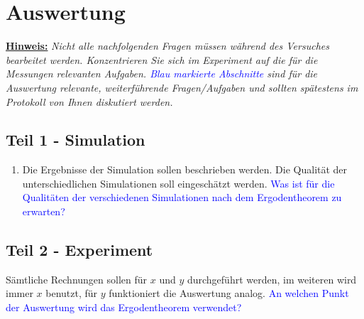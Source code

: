 \section*{Auswertung}

\textbf{\underline{Hinweis:}}\textit{ Nicht alle nachfolgenden Fragen müssen während des Versuches bearbeitet werden. Konzentrieren Sie sich im Experiment auf die für die Messungen relevanten Aufgaben. \textcolor{blue}{Blau markierte Abschnitte} sind für die Auswertung relevante, weiterführende Fragen/Aufgaben und sollten spätestens im Protokoll von Ihnen diskutiert werden.}\newline

\subsection*{Teil 1 - Simulation}

\begin{enumerate}

  \item Die Ergebnisse der Simulation sollen beschrieben werden. Die Qualität der unterschiedlichen Simulationen soll eingeschätzt werden.
  \textcolor{blue}{Was ist für die Qualitäten der verschiedenen Simulationen nach dem Ergodentheorem zu erwarten?}

\end{enumerate}

\subsection*{Teil 2 - Experiment}

Sämtliche Rechnungen sollen für $x$ und $y$ durchgeführt werden, im weiteren wird immer $x$ benutzt, für $y$ funktioniert die Auswertung analog.
\textcolor{blue}{An welchen Punkt der Auswertung wird das Ergodentheorem verwendet?}

